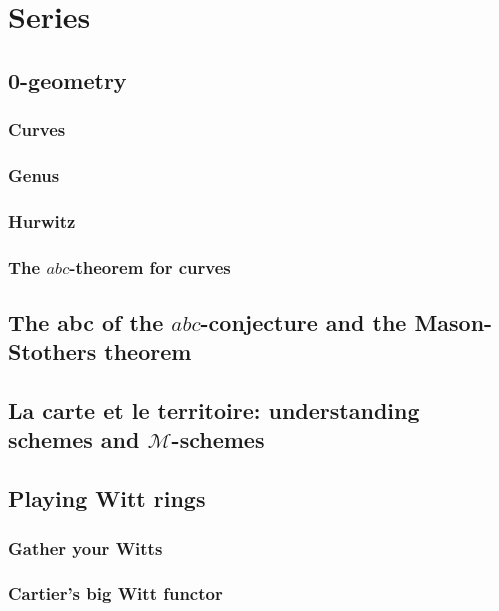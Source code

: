 \documentclass[a4paper]{memoir}
\begin{document}
\part{Series}

\chapter{0-geometry}
\section{Curves}
\section{Genus}
\section{Hurwitz}
\section{The $abc$-theorem for curves}



\chapter{The abc of the $abc$-conjecture and the Mason-Stothers theorem}





\chapter{La carte et le territoire: understanding schemes and $\mathcal{M}$-schemes}








\chapter{Playing Witt rings}
\section{Gather your Witts}
\section{Cartier's big Witt functor}
\end{document}
